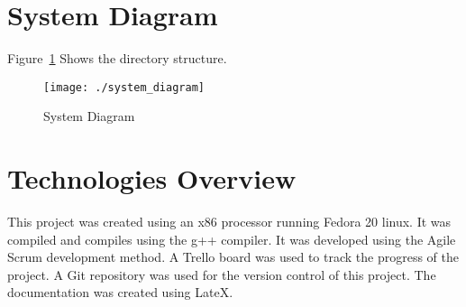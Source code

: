 \pagebreak
\section{System Diagram}

Figure~\ref{system_diagram} Shows the directory structure.

\begin{figure}[H]
\begin{center}
\texttt{[image: ./system\_diagram]}
\end{center}
\caption{System Diagram \label{system_diagram}}
\end{figure}

\section{Technologies Overview}
This project was created using an x86 processor running Fedora 20 linux. It was
compiled and compiles using the g++ compiler. It was developed using the Agile
Scrum development method. A Trello board was used to track the progress of the
project. A Git repository was used for the version control of this project. The
documentation was created using LateX.
